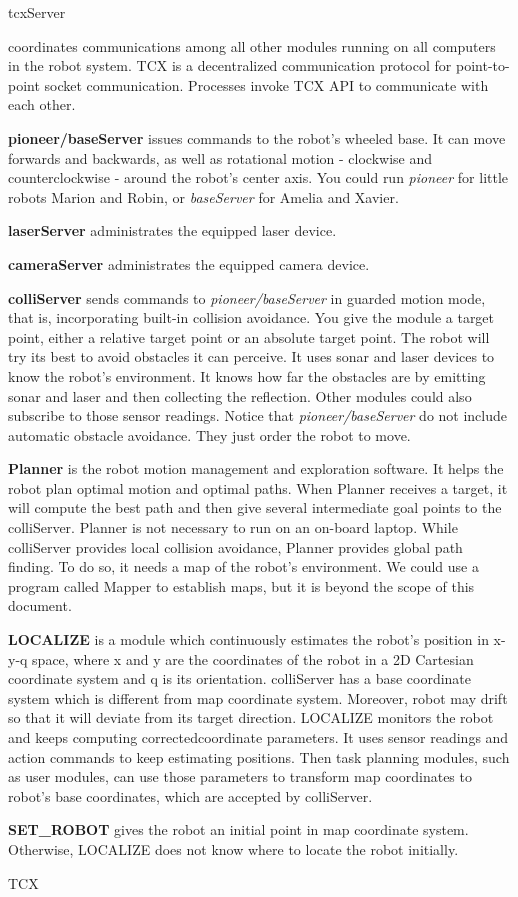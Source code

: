\begin{itemize}{\bf \item tcxServer} coordinates communications among
  all other modules running on all computers in the robot system. TCX
  is a decentralized communication protocol for point-to-point socket
  communication. Processes invoke TCX API to communicate with each
  other.\item {\bf pioneer/baseServer} issues commands to the robot's
  wheeled base. It can move forwards and backwards, as well as
  rotational motion - clockwise and counterclockwise - around the
  robot's center axis. You could run {\it pioneer} for little robots
  Marion and Robin, or {\it baseServer} for Amelia and Xavier. \item
  {\bf laserServer} administrates the equipped laser device. \item
  {\bf cameraServer }administrates the equipped camera device.\item
  {\bf colliServer} sends commands to {\it pioneer/baseServer} in
  guarded motion mode, that is, incorporating built-in collision
  avoidance. You give the module a target point, either a relative
  target point or an absolute target point. The robot will try its
  best to avoid obstacles it can perceive. It uses sonar and laser
  devices to know the robot's environment. It knows how far the
  obstacles are by emitting sonar and laser and then collecting the
  reflection. Other modules could also subscribe to those sensor
  readings. Notice that {\it pioneer/baseServer} do not include
  automatic obstacle avoidance. They just order the robot to
  move.\item {\bf Planner} is the robot motion management and
  exploration software. It helps the robot plan optimal motion and
  optimal paths. When Planner receives a target, it will compute the
  best path and then give several intermediate goal points to the
  colliServer. Planner is not necessary to run on an on-board laptop.
  While colliServer provides local collision avoidance, Planner
  provides global path finding. To do so, it needs a map of the
  robot's environment.  We could use a program called Mapper to
  establish maps, but it is beyond the scope of this document.\item
  {\bf LOCALIZE }is a module which continuously estimates the robot's
  position in x-y-q space, where x and y are the coordinates of the
  robot in a 2D Cartesian coordinate system and q is its orientation.
  colliServer has a base coordinate system which is different from map
  coordinate system. Moreover, robot may drift so that it will deviate
  from its target direction. LOCALIZE monitors the robot and keeps{\bf
    }computing corrected{\bf }coordinate parameters. It uses sensor
  readings and action commands to keep estimating positions. Then task
  planning modules, such as user modules, can use those parameters to
  transform map coordinates to robot's base coordinates, which are
  accepted by colliServer.  \item {\bf SET\_ROBOT }gives the robot an
  initial point in map coordinate system. Otherwise, LOCALIZE does not
  know where to locate the robot initially.\end{itemize}\par TCX
